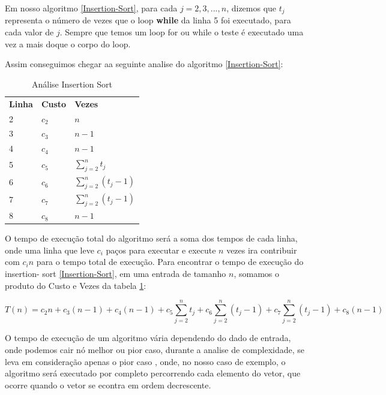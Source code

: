 \documentclass[
	12pt,				%
	openright,			%
	oneside,			%
	a4paper,			%
	english,			%
	brazil				%
	]{abntex2}
\begin{document}
Em nosso algoritmo \ref{Insertion-Sort}, para cada $j = 2, 3, ..., n$, dizemos que $t_j$ representa o número de vezes que
o loop \textbf{while} da linha 5 foi executado, para cada valor de $j$. Sempre que temos um loop for ou while o teste é
executado uma vez a mais doque o corpo do loop.

Assim conseguimos chegar aa seguinte analise do algoritmo \ref{Insertion-Sort}:

\begin{table}[h!]
	\centering
	\caption{\label{Análise-Insertion-Sort} Análise Insertion Sort}
	\begin{tabular}{lll}
		\textbf{Linha} & \textbf{Custo} & \textbf{Vezes} \\
		2 & $c_2$ & $n$ \\
		3 & $c_3$ & $n-1$ \\
		4 & $c_4$ & $n-1$ \\
		5 & $c_5$ & $\sum_{j=2}^{n} t_j$ \\
		6 & $c_6$ & $\sum_{j=2}^{n} (t_j - 1)$ \\
		7 & $c_7$ & $\sum_{j=2}^{n} (t_j - 1)$ \\
		8 & $c_8$ & $n-1$ \\
	\end{tabular}
\end{table}

O tempo de execução total do algoritmo será a soma dos tempos de cada linha, onde uma linha que leve $c_i$ paços para executar
e execute $n$ vezes ira contribuir com $c_in$ para o tempo total de execução. Para encontrar o tempo de execução do insertion-
sort \ref{Insertion-Sort}, em uma entrada de tamanho $n$, somamos o produto do Custo e Vezes da tabela \ref{Análise-Insertion-Sort}:

\begin{equation}
	\label{tempo-execução-insertion-sort}
	T(n) = c_2n + c_3(n - 1) + c_4(n - 1) + c_5\sum_{j=2}^{n} t_j + c_6\sum_{j=2}^{n} (t_j - 1) + c_7\sum_{j=2}^{n} (t_j - 1) + c_8(n-1)
\end{equation}

O tempo de execução de um algoritmo vária dependendo do dado de entrada, onde podemos cair nó melhor ou pior caso, durante a
analise de complexidade, se leva em consideração apenas o pior caso \cite{introductionAlgorthms}, onde, no nosso caso de exemplo, 
o algoritmo será executado por completo percorrendo cada elemento do vetor, que ocorre quando o vetor se econtra em ordem decrescente.
\end{document}
